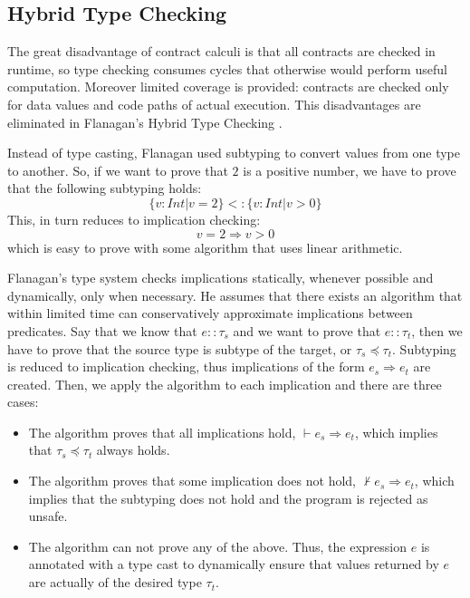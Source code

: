 \subsection{Hybrid Type Checking}

The great disadvantage of contract calculi is that all contracts are checked in runtime, 
so type checking consumes cycles that otherwise would perform useful computation.
Moreover limited coverage is provided: contracts are checked only for data values and
code paths of actual execution.
This disadvantages are eliminated in Flanagan's Hybrid Type Checking \cite{flanagan06}.
%

Instead of type casting, Flanagan used subtyping to convert values from one type to another.
So, if we want to prove that $2$ is a positive number, we have to prove that 
the following subtyping holds:
$$\{v:Int | v = 2\} <: \{v:Int | v > 0\}$$
This, in turn reduces to implication checking:
$$ v = 2 \Rightarrow v > 0$$
which is easy to prove with some algorithm that uses linear arithmetic.


Flanagan's type system checks implications statically, whenever possible
and dynamically, only when necessary.
He assumes that 
there exists an algorithm that within limited time can
conservatively approximate implications between predicates.
Say that we know that %
$e :: \tau_s$ and we want to prove that $e :: \tau_t$, 
then we have to prove that the source type is subtype of the target, 
or $\tau_s\preceq \tau_t$. 
Subtyping is reduced to implication checking, thus implications of the form
$e_s \Rightarrow e_t$ are created.
Then,
we apply the algorithm to each implication and there are three cases:
\begin{itemize}
\item The algorithm proves that all implications hold, 
 $\vdash e_s \Rightarrow e_t$, 
which implies that $\tau_s\preceq \tau_t$ always holds.
\item The algorithm proves that some implication does not hold, 
$\nvdash e_s \Rightarrow e_t$, 
which implies that the subtyping does not hold %
and the program is rejected as unsafe.
\item The algorithm can not prove any of the above.
Thus, the expression $e$ is annotated with a type cast 
to dynamically ensure that values returned by $e$ are actually of the desired type $\tau_t$.
\end{itemize}

